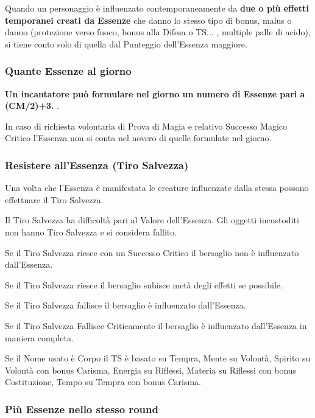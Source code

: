 \documentclass[a4paper,twoside,openany]{book}
\begin{document}
\begin{multicols}{2}
\label{influenzati-da-piu-essenze}

Quando un personaggio è influenzato contemporaneamente da \textbf{due o più effetti temporanei creati da Essenze} che danno lo stesso tipo di bonus, malus o danno (protezione verso fuoco, bonus alla Difesa o TS... , multiple palle di acido), si tiene conto solo di quella dal Punteggio dell'Essenza maggiore.


\subsubsection{Quante Essenze al giorno}


\textbf{Un incantatore può formulare nel giorno un numero di Essenze pari a (CM/2)+3.} .

In caso di richiesta volontaria di Prova di Magia e relativo Successo Magico Critico l'Essenza  non si conta nel novero di quelle formulate nel giorno.


\subsubsection{Resistere all'Essenza (Tiro Salvezza)}

\label{resistere-allessenza-tiro-salvezza}

Una volta che l'Essenza è manifestata le creature influenzate dalla stessa possono effettuare il Tiro Salvezza.

Il Tiro Salvezza ha difficoltà pari al Valore dell'Essenza. Gli oggetti incustoditi non hanno Tiro Salvezza e si considera fallito.

Se il Tiro Salvezza riesce con un Successo Critico il bersaglio non è influenzato dall'Essenza.

Se il Tiro Salvezza riesce il bersaglio subisce metà degli effetti se possibile.

Se il Tiro Salvezza fallisce il bersaglio è influenzato dall'Essenza.

Se il Tiro Salvezza Fallisce Criticamente il bersaglio è influenzato dall'Essenza in maniera completa.

Se il Nome usato è Corpo il TS è basato su Tempra, Mente su Volontà, Spirito su Volontà con bonus Carisma, Energia su Riflessi, Materia su Riflessi con bonus Costituzione, Tempo su Tempra con bonus Carisma.


\subsubsection{Più Essenze nello stesso round}


\end{multicols}
\end{document}
